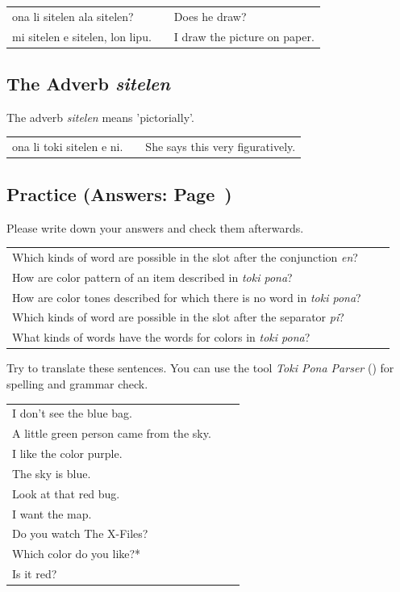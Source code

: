 \begin{supertabular}{p{5,5cm}|ll}
    ona li sitelen ala sitelen?     &  & Does he draw?                \\
    mi sitelen e sitelen, lon lipu. &  & I draw the picture on paper. \\
\end{supertabular}

\subsection*{The Adverb \textit{sitelen}}
The adverb \textit{sitelen} means 'pictorially'.

\begin{supertabular}{p{5,5cm}|ll}
    ona li toki sitelen e ni. &  & She says this very figuratively. \\
\end{supertabular}

\newpage

\subsection*{Practice (Answers: Page~\pageref{'colors'})}
Please write down your answers and check them afterwards.

\begin{supertabular}{p{5,5cm}|ll}
    Which kinds of word are possible in the slot after the conjunction \textit{en}? &  & \\
    How are color pattern of an item described in \textit{toki pona}?               &  & \\
    How are color tones described for which there is no word in \textit{toki pona}? &  & \\
    Which kinds of word are possible in the slot after the separator \textit{pi}?   &  & \\
    What kinds of words have the words for colors in \textit{toki pona}?            &  & \\
\end{supertabular}

Try to translate these sentences.
You can use the tool \textit{Toki Pona Parser} (\cite{www:rowa:02}) for spelling and grammar check.

\begin{supertabular}{p{5,5cm}|ll}
    I don't see the blue bag.                &  & \\
    A little green person came from the sky. &  & \\
    I like the color purple.                 &  & \\
    The sky is blue.                         &  & \\
    Look at that red bug.                    &  & \\
    I want the map.                          &  & \\
    Do you watch The X-Files?                &  & \\
    Which color do you like?*                &  & \\
    Is it red?                               &  & \\
\end{supertabular}

